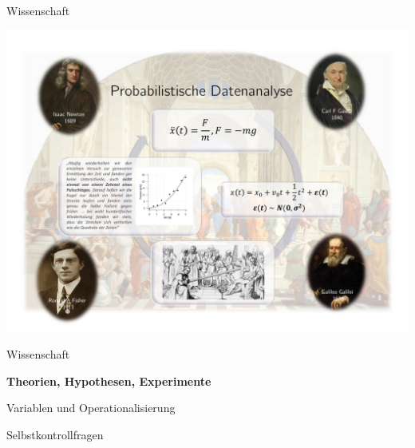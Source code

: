 \documentclass[
  8pt,
  ignorenonframetext,
]{beamer}
\begin{document}
\begin{frame}{Wissenschaft}
\protect\hypertarget{wissenschaft-5}{}
\begin{center}\includegraphics[width=0.95\linewidth]{1_Abbildungen/pfm_1_wissenschaft_prozess_freierfall_noise} \end{center}
\end{frame}

\begin{frame}{}
\protect\hypertarget{section-4}{}
\vfill
{}
\Large

Wissenschaft

\textbf{Theorien, Hypothesen, Experimente}

Variablen und Operationalisierung

Selbstkontrollfragen
\end{frame}
\end{document}
